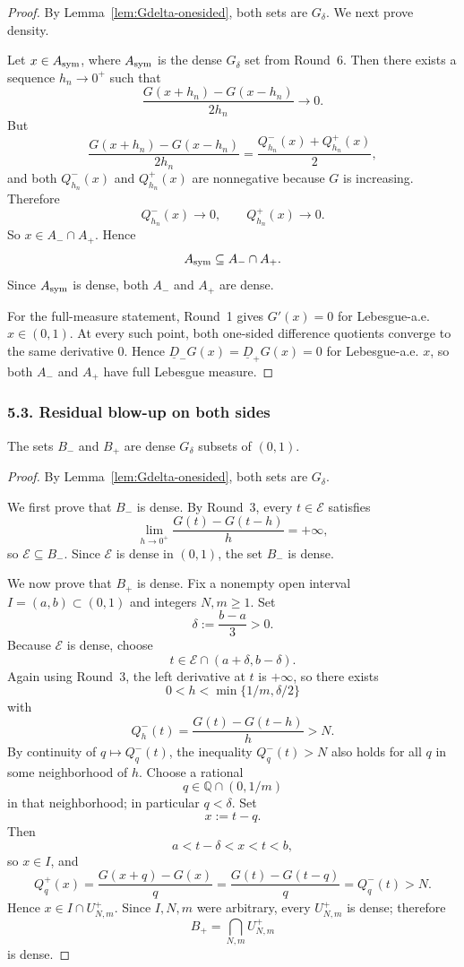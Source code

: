 \begin{proof}
By Lemma~\ref{lem:Gdelta-onesided}, both sets are $G_\delta$.
We next prove density.

Let $x\in A_{\rm sym}$, where $A_{\rm sym}$ is the dense $G_\delta$ set from Round~6.
Then there exists a sequence $h_n\to0^+$ such that
\[
\frac{G(x+h_n)-G(x-h_n)}{2h_n}\to0.
\]
But
\[
\frac{G(x+h_n)-G(x-h_n)}{2h_n}=\frac{Q_{h_n}^-(x)+Q_{h_n}^+(x)}{2},
\]
and both $Q_{h_n}^-(x)$ and $Q_{h_n}^+(x)$ are nonnegative because $G$ is increasing.
Therefore
\[
Q_{h_n}^-(x)\to0,
\qquad
Q_{h_n}^+(x)\to0.
\]
So $x\in A_-\cap A_+$. Hence
\[
A_{\rm sym}\subseteq A_-\cap A_+.
\]
Since $A_{\rm sym}$ is dense, both $A_-$ and $A_+$ are dense.

For the full-measure statement, Round~1 gives $G'(x)=0$ for Lebesgue-a.e. $x\in(0,1)$.
At every such point, both one-sided difference quotients converge to the same derivative $0$.
Hence $\underline D_-G(x)=\underline D_+G(x)=0$ for Lebesgue-a.e. $x$, so both $A_-$ and $A_+$ have full Lebesgue measure.
\end{proof}

\subsubsection*{5.3. Residual blow-up on both sides}

\begin{theorem}\label{thm:uppers-infty}
The sets $B_-$ and $B_+$ are dense $G_\delta$ subsets of $(0,1)$.
\end{theorem}

\begin{proof}
By Lemma~\ref{lem:Gdelta-onesided}, both sets are $G_\delta$.

We first prove that $B_-$ is dense.
By Round~3, every $t\in\mathcal E$ satisfies
\[
\lim_{h\to0^+}\frac{G(t)-G(t-h)}{h}=+\infty,
\]
so $\mathcal E\subseteq B_-$. Since $\mathcal E$ is dense in $(0,1)$, the set $B_-$ is dense.

We now prove that $B_+$ is dense.
Fix a nonempty open interval $I=(a,b)\subset(0,1)$ and integers $N,m\ge1$.
Set
\[
\delta:=\frac{b-a}{3}>0.
\]
Because $\mathcal E$ is dense, choose
\[
t\in\mathcal E\cap(a+\delta,b-\delta).
\]
Again using Round~3, the left derivative at $t$ is $+\infty$, so there exists
\[
0<h<\min\{1/m,\delta/2\}
\]
with
\[
Q_h^-(t)=\frac{G(t)-G(t-h)}{h}>N.
\]
By continuity of $q\mapsto Q_q^-(t)$, the inequality $Q_q^-(t)>N$ also holds for all $q$ in some neighborhood of $h$.
Choose a rational
\[
q\in\mathbb Q\cap(0,1/m)
\]
in that neighborhood; in particular $q<\delta$. Set
\[
x:=t-q.
\]
Then
\[
a<t-\delta<x<t<b,
\]
so $x\in I$, and
\[
Q_q^+(x)=\frac{G(x+q)-G(x)}{q}=\frac{G(t)-G(t-q)}{q}=Q_q^-(t)>N.
\]
Hence $x\in I\cap U^+_{N,m}$.
Since $I,N,m$ were arbitrary, every $U^+_{N,m}$ is dense; therefore
\[
B_+=\bigcap_{N,m}U^+_{N,m}
\]
is dense.
\end{proof}

